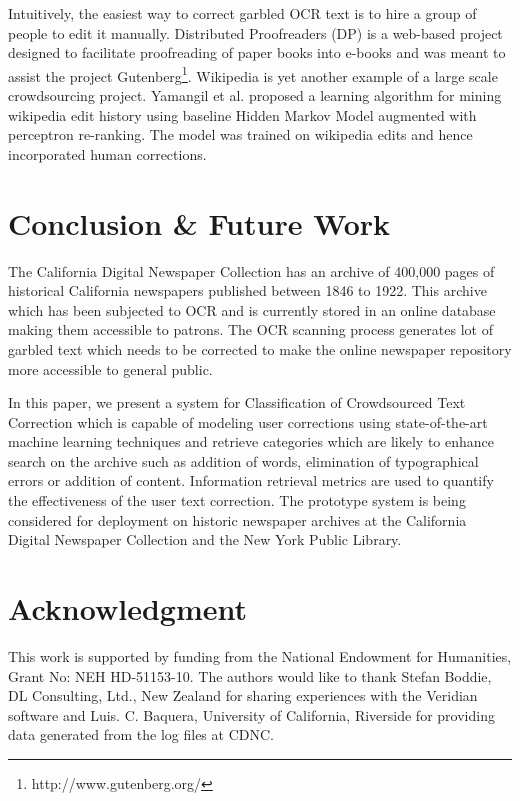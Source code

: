 \documentclass[letterpaper]{article}
\begin{document}
Intuitively, the easiest way to correct garbled OCR text is to hire a group of people to edit it manually. Distributed Proofreaders (DP) \cite{DP} is a web-based project designed to facilitate proofreading of paper books into e-books and was meant to assist the project Gutenberg\footnote{http://www.gutenberg.org/}. Wikipedia is yet another example of a large scale crowdsourcing project. Yamangil et al. \cite{wikiedits} proposed a learning algorithm for mining wikipedia edit history using baseline Hidden Markov Model augmented with perceptron re-ranking. The model was trained on wikipedia edits and hence incorporated human corrections. 



\section{Conclusion \& Future Work}
\label{sec:conc}
The California Digital Newspaper Collection has an archive of 400,000 pages of historical California newspapers published between 1846 to 1922. This archive which has been subjected to OCR and is currently stored in an online database making them accessible to patrons. The OCR scanning process generates lot of garbled text which needs to be corrected to make the online newspaper repository more accessible to general public. 

In this paper, we present a system for Classification of Crowdsourced Text Correction which is capable of modeling user corrections using state-of-the-art machine learning techniques and retrieve categories which are likely to enhance search on the archive such as addition of words, elimination of typographical errors or addition of content. Information retrieval metrics are used to quantify the effectiveness of the user text correction. The prototype system is being considered for deployment on historic newspaper archives at the California Digital Newspaper Collection and the New York Public Library.

\section*{Acknowledgment}
This work is supported by funding from the National Endowment for Humanities, Grant No: NEH HD-51153-10. The authors would like to thank Stefan Boddie, DL Consulting, Ltd., New Zealand for sharing experiences with the Veridian software and Luis. C. Baquera, University of California, Riverside for providing data generated from the log files at CDNC.\\




\end{document}
